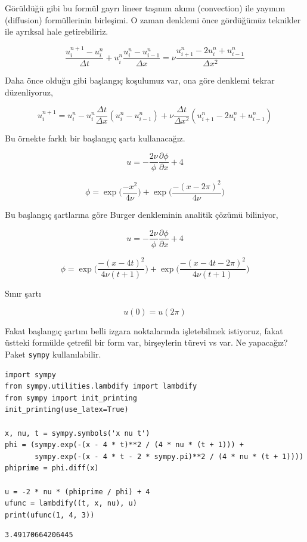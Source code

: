 \documentclass[12pt,fleqn]{article}\usepackage{../../common}
\begin{document}
Görüldüğü gibi bu formül gayrı lineer taşınım akımı (convection) ile yayınım
(diffusion) formüllerinin birleşimi. O zaman denklemi önce gördüğümüz teknikler
ile ayrıksal hale getirebiliriz.

$$
\frac{u_i^{n+1}-u_i^n}{\Delta t} + u_i^n \frac{u_i^n - u_{i-1}^n}{\Delta x} =
\nu \frac{u_{i+1}^n - 2u_i^n + u_{i-1}^n}{\Delta x^2}
$$

Daha önce olduğu gibi başlangıç koşulumuz var, ona göre denklemi tekrar
düzenliyoruz,

$$
u_i^{n+1} =
u_i^n - u_i^n \frac{\Delta t}{\Delta x} (u_i^n - u_{i-1}^n) +
\nu \frac{\Delta t}{\Delta x^2}(u_{i+1}^n - 2u_i^n + u_{i-1}^n)
$$

Bu örnekte farklı bir başlangıç şartı kullanacağız.

$$
u = -\frac{2 \nu}{\phi} \frac{\partial \phi}{\partial x} + 4 
$$

$$
\phi = \exp \bigg(\frac{-x^2}{4 \nu} \bigg) + \exp \bigg(\frac{-(x-2 \pi)^2}{4 \nu} \bigg)
$$

Bu başlangıç şartlarına göre Burger denkleminin analitik çözümü biliniyor,

$$
u = -\frac{2 \nu}{\phi} \frac{\partial \phi}{\partial x} + 4
$$

$$
\phi = \exp \bigg(\frac{-(x-4t)^2}{4 \nu (t+1)} \bigg) + \exp \bigg(\frac{-(x-4t -2 \pi)^2}{4 \nu(t+1)} \bigg)
$$

Sınır şartı

$$
u(0) = u(2\pi)
$$

Fakat başlangıç şartını belli izgara noktalarında işletebilmek istiyoruz, fakat
üstteki formülde çetrefil bir form var, birşeylerin türevi vs var. Ne yapacağız? 
Paket \verb!sympy! kullanılabilir.

\begin{verbatim}
import sympy
from sympy.utilities.lambdify import lambdify
from sympy import init_printing
init_printing(use_latex=True)

x, nu, t = sympy.symbols('x nu t')
phi = (sympy.exp(-(x - 4 * t)**2 / (4 * nu * (t + 1))) +
       sympy.exp(-(x - 4 * t - 2 * sympy.pi)**2 / (4 * nu * (t + 1))))
phiprime = phi.diff(x)

u = -2 * nu * (phiprime / phi) + 4
ufunc = lambdify((t, x, nu), u)
print(ufunc(1, 4, 3))
\end{verbatim}

\begin{verbatim}
3.49170664206445
\end{verbatim}
\end{document}

